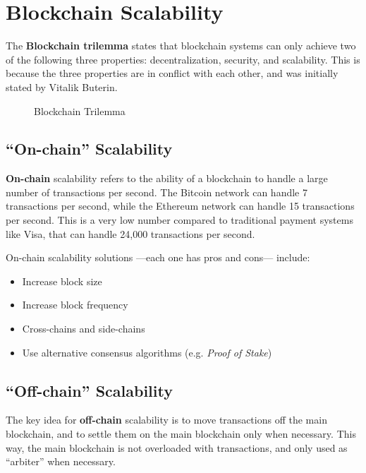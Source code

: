 \chapter{Blockchain Scalability}
The \textbf{Blockchain trilemma} states that blockchain systems can only achieve two of the following three properties: decentralization, security, and scalability. This is because the three properties are in conflict with each other, and was initially stated by Vitalik Buterin.

\begin{figure}[htbp]
   \centering
  \caption{Blockchain Trilemma}
   \label{fig:blockchain_trilemma}
\end{figure}

\section{``On-chain'' Scalability}
\textbf{On-chain} scalability refers to the ability of a blockchain to handle a large number of transactions per second. The Bitcoin network can handle 7 transactions per second, while the Ethereum network can handle 15 transactions per second. This is a very low number compared to traditional payment systems like Visa, that can handle 24,000 transactions per second.

On-chain scalability solutions ---each one has pros and cons--- include:
\begin{itemize}
   \item Increase block size
   \item Increase block frequency
   \item Cross-chains and side-chains 
   \item Use alternative consensus algorithms (e.g. \textit{Proof of Stake})
\end{itemize}

\section{``Off-chain'' Scalability}
The key idea for \textbf{off-chain} scalability is to move transactions off the main blockchain, and to settle them on the main blockchain only when necessary. This way, the main blockchain is not overloaded with transactions, and only used as ``arbiter'' when necessary.


